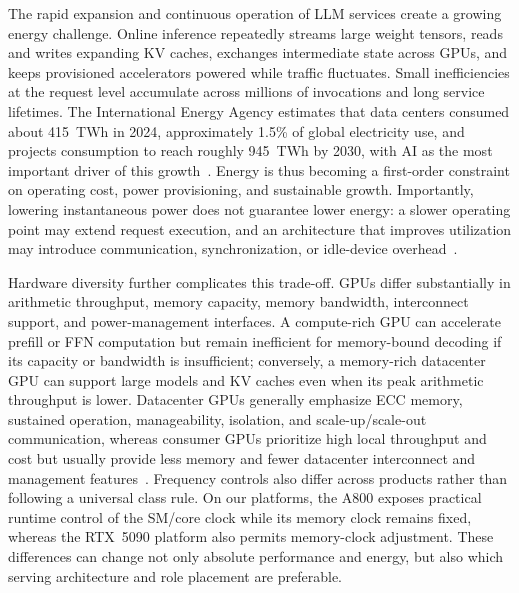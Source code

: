 The rapid expansion and continuous operation of LLM services create a growing energy challenge. Online inference repeatedly streams large weight tensors, reads and writes expanding KV caches, exchanges intermediate state across GPUs, and keeps provisioned accelerators powered while traffic fluctuates. Small inefficiencies at the request level accumulate across millions of invocations and long service lifetimes. The International Energy Agency estimates that data centers consumed about 415~TWh in 2024, approximately 1.5\% of global electricity use, and projects consumption to reach roughly 945~TWh by 2030, with AI as the most important driver of this growth~\cite{iea2025energyai}. Energy is thus becoming a first-order constraint on operating cost, power provisioning, and sustainable growth. Importantly, lowering instantaneous power does not guarantee lower energy: a slower operating point may extend request execution, and an architecture that improves utilization may introduce communication, synchronization, or idle-device overhead~\cite{zhang2026distributedenergy,ifath2026characterizing}.

Hardware diversity further complicates this trade-off. GPUs differ substantially in arithmetic throughput, memory capacity, memory bandwidth, interconnect support, and power-management interfaces. A compute-rich GPU can accelerate prefill or FFN computation but remain inefficient for memory-bound decoding if its capacity or bandwidth is insufficient; conversely, a memory-rich datacenter GPU can support large models and KV caches even when its peak arithmetic throughput is lower. Datacenter GPUs generally emphasize ECC memory, sustained operation, manageability, isolation, and scale-up/scale-out communication, whereas consumer GPUs prioritize high local throughput and cost but usually provide less memory and fewer datacenter interconnect and management features~\cite{nvidiaA800datasheet,nvidiaL40Sspec,nvidiaRTXBlackwell,nvidiaL20spec}. Frequency controls also differ across products rather than following a universal class rule. On our platforms, the A800 exposes practical runtime control of the SM/core clock while its memory clock remains fixed, whereas the RTX~5090 platform also permits memory-clock adjustment. These differences can change not only absolute performance and energy, but also which serving architecture and role placement are preferable.

